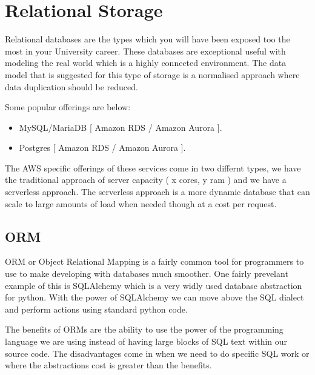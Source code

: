 \documentclass{csse4400}
\begin{document}

\section{Relational Storage}

Relational databases are the types which you will have been exposed too the most in your University career.
These databases are exceptional useful with modeling the real world which is a highly connected environment.
The data model that is suggested for this type of storage is a normalised approach where data duplication should 
be reduced.


Some popular offerings are below:

\begin{itemize}
  \item MySQL/MariaDB [ Amazon RDS / Amazon Aurora ].
  \item Postgres [ Amazon RDS / Amazon Aurora ].
\end{itemize}

The AWS specific offerings of these services come in two differnt types, we have the traditional approach of
server capacity ( x cores, y ram ) and we have a serverless approach. The serverless approach is a more dynamic
database that can scale to large amounts of load when needed though at a cost per request.

  \subsection{ORM}
  ORM or Object Relational Mapping is a fairly common tool for programmers to use to make developing with 
  databases much smoother. One fairly prevelant example of this is SQLAlchemy which is a very widly used 
  database abstraction for python. With the power of SQLAlchemy we can move above the SQL dialect and perform
  actions using standard python code.

  The benefits of ORMs are the ability to use the power of the programming language we are using instead of having
  large blocks of SQL text within our source code. The disadvantages come in when we need to do specific SQL work
  or where the abstractions cost is greater than the benefits.
\end{document}
